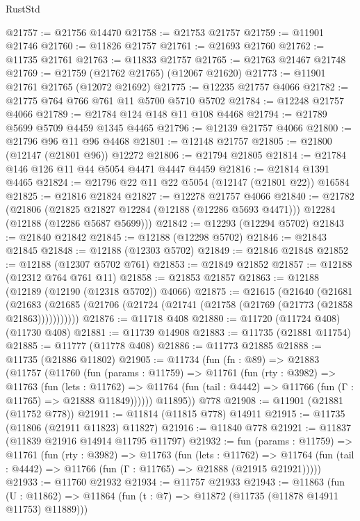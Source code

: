 \begin{lexlean}{RustStd}
\begin{coremodule}
@21757 := @21756 @14470
@21758 := @21753 @21757
@21759 := @11901 @21746
@21760 := @11826 @21757
@21761 := @21693 @21760
@21762 := @11735 @21761
@21763 := @11833 @21757
@21765 := @21763 @21467 @21748
@21769 := @21759 (@21762 @21765) (@12067 @21620)
@21773 := @11901 @21761 @21765 (@12072 @21692)
@21775 := @12235 @21757 @4066
@21782 := @21775 @764 @766 @761 @11 @5700 @5710 @5702
@21784 := @12248 @21757 @4066
@21789 := @21784 @124 @148 @11 @108 @4468
@21794 := @21789 @5699 @5709 @4459 @1345 @4465
@21796 := @12139 @21757 @4066
@21800 := @21796 @96 @11 @96 @4468
@21801 := @12148 @21757
@21805 := @21800 (@12147 (@21801 @96)) @12272
@21806 := @21794 @21805
@21814 := @21784 @146 @126 @11 @44 @5054 @4471 @4447 @4459
@21816 := @21814 @1391 @4465
@21824 := @21796 @22 @11 @22 @5054 (@12147 (@21801 @22)) @16584
@21825 := @21816 @21824
@21827 := @12278 @21757 @4066
@21840 := @21782
    (@21806
      (@21825 @21827 @12284 (@12188 (@12286 @5693 @4471)))
      @12284
      (@12188 (@12286 @5687 @5699)))
@21842 := @12293 (@12294 @5702)
@21843 := @21840 @21842
@21845 := @12188 (@12298 @5702)
@21846 := @21843 @21845
@21848 := @12188 (@12303 @5702)
@21849 := @21846 @21848
@21852 := @12188 (@12307 @5702 @761)
@21853 := @21849 @21852
@21857 := @12188 (@12312 @764 @761 @11)
@21858 := @21853 @21857
@21863 := @12188 (@12189 (@12190 (@12318 @5702)) @4066)
@21875 := @21615
    (@21640
      (@21681
        (@21683 (@21685 (@21706 (@21724 (@21741 (@21758 (@21769 (@21773 (@21858 @21863)))))))))))
@21876 := @11718 @408
@21880 := @11720 (@11724 @408) (@11730 @408)
@21881 := @11739 @14908
@21883 := @11735 (@21881 @11754)
@21885 := @11777 (@11778 @408)
@21886 := @11773 @21885
@21888 := @11735 (@21886 @11802)
@21905 := @11734
    (fun (fn : @89) =>
    @21883
      (@11757
        (@11760
          (fun (params : @11759) =>
          @11761
            (fun (rty : @3982) =>
            @11763
              (fun (lets : @11762) =>
              @11764 (fun (tail : @4442) => @11766 (fun (Γ : @11765) => @21888 @11849))))))
        @11895))
    @778
@21908 := @11901 (@21881 (@11752 @778))
@21911 := @11814 (@11815 @778) @14911
@21915 := @11735 (@11806 (@21911 @11823) @11827)
@21916 := @11840 @778
@21921 := @11837 (@11839 @21916 @14914 @11795 @11797)
@21932 := fun (params : @11759) =>
  @11761
    (fun (rty : @3982) =>
    @11763
      (fun (lets : @11762) =>
      @11764 (fun (tail : @4442) => @11766 (fun (Γ : @11765) => @21888 (@21915 @21921)))))
@21933 := @11760 @21932
@21934 := @11757 @21933
@21943 := @11863
    (fun (U : @11862) => @11864 (fun (t : @7) => @11872 (@11735 (@11878 @14911 @11753) @11889)))

\end{coremodule}
\end{lexlean}
